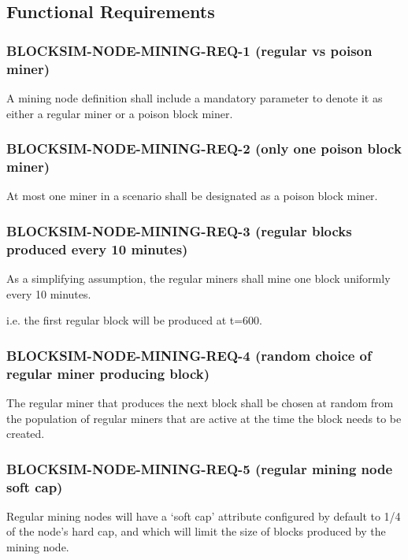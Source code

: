 \documentclass{scrreprt}
\begin{document}
    \subsection{Functional Requirements}

      \subsubsection{BLOCKSIM-NODE-MINING-REQ-1 (regular vs poison miner)}

        A mining node definition shall include a mandatory parameter to denote
        it as either a regular miner or a poison block miner.

      \subsubsection{BLOCKSIM-NODE-MINING-REQ-2 (only one poison block miner)}

        At most one miner in a scenario shall be designated as a poison block
        miner.

      \subsubsection{BLOCKSIM-NODE-MINING-REQ-3 (regular blocks produced every 10 minutes)}

        As a simplifying assumption, the regular miners shall mine one block
        uniformly every 10 minutes.

        i.e. the first regular block will be produced at t=600.

      \subsubsection{BLOCKSIM-NODE-MINING-REQ-4 (random choice of regular miner producing block)}

        The regular miner that produces the next block shall be chosen at
        random from the population of regular miners that are active at the
        time the block needs to be created.

      \subsubsection{BLOCKSIM-NODE-MINING-REQ-5 (regular mining node soft cap)}

        Regular mining nodes will have a `soft cap' attribute configured by
        default to 1/4 of the node's hard cap, and which will limit the
        size of blocks produced by the mining node.
\end{document}
